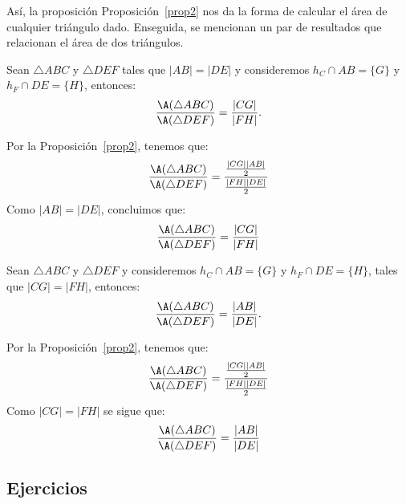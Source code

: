 

Así, la proposición Proposición~\ref{prop2} nos da la forma de calcular el área de cualquier triángulo dado. 
Enseguida, se mencionan un par de resultados que relacionan el área de dos triángulos. 
		 
\begin{prop}\label{prop3}
Sean $\triangle ABC$ y $\triangle DEF$ tales que $|AB|=|DE|$ y consideremos $h_{C}\cap AB=\{G\}$ y $h_{F}\cap DE=\{H\}$, entonces:
$$\frac{\A(\triangle ABC)}{\A(\triangle DEF)}= \frac{|CG|}{|FH|}.$$
		
\end{prop}
\begin{pba} Por la Proposición~\ref{prop2}, tenemos que:
$$\frac{\A(\triangle ABC)}{\A(\triangle DEF)}= \frac{\frac{|CG||AB|}{2}}{\frac{|FH||DE|}{2}}$$
Como $|AB|=|DE|$, concluimos que:
$$\frac{\A(\triangle ABC)}{\A(\triangle DEF)}= \frac{|CG|}{|FH|}$$
\end{pba}
		 
\begin{prop}\label{prop4}
Sean $\triangle ABC$ y $\triangle DEF$ y consideremos $h_{C}\cap AB=\{G\}$ y $h_{F}\cap DE=\{H\}$, tales que $|CG|=|FH|$, entonces: 
$$\frac{\A(\triangle ABC)}{\A(\triangle DEF)}= \frac{|AB|}{|DE|}.$$
\end{prop}
\begin{pba}Por la Proposición~\ref{prop2}, tenemos que:
$$\frac{\A(\triangle ABC)}{\A(\triangle DEF)}= \frac{\frac{|CG||AB|}{2}}{\frac{|FH||DE|}{2}}$$ 
Como $|CG|=|FH|$ se sigue que:
$$\frac{\A(\triangle ABC)}{\A(\triangle DEF)}= \frac{|AB|}{|DE|}$$
\end{pba}
 


\subsection*{Ejercicios}

